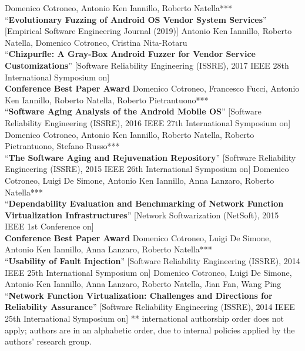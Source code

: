 \documentclass[margin,line]{resume}
\begin{document}
\begin{resume}
\filbreak
Domenico Cotroneo, Antonio Ken Iannillo, Roberto Natella***\\
``\textbf{Evolutionary Fuzzing of Android OS Vendor System Services}''
[Empirical Software Engineering Journal (2019)]
\filbreak
Antonio Ken Iannillo, Roberto Natella, Domenico Cotroneo, Cristina Nita-Rotaru\\
``\textbf{Chizpurfle: A Gray-Box Android Fuzzer for Vendor Service Customizations}''
[Software Reliability Engineering (ISSRE), 2017 IEEE 28th International Symposium on]\\\textbf{Conference Best Paper Award}
\filbreak
Domenico Cotroneo, Francesco Fucci, Antonio Ken Iannillo, Roberto Natella, Roberto Pietrantuono***\\
``\textbf{Software Aging Analysis of the Android Mobile OS}''
[Software Reliability Engineering (ISSRE), 2016 IEEE 27th International Symposium on]
\filbreak
Domenico Cotroneo, Antonio Ken Iannillo, Roberto Natella, Roberto Pietrantuono, Stefano Russo***\\
``\textbf{The Software Aging and Rejuvenation Repository}''
[Software Reliability Engineering (ISSRE), 2015 IEEE 26th International Symposium on]
\filbreak
Domenico Cotroneo, Luigi De Simone, Antonio Ken Iannillo, Anna Lanzaro, Roberto Natella***\\
``\textbf{Dependability Evaluation and Benchmarking of Network Function Virtualization Infrastructures}''
[Network Softwarization (NetSoft), 2015 IEEE 1st Conference on]\\\textbf{Conference Best Paper Award}
\filbreak
Domenico Cotroneo, Luigi De Simone, Antonio Ken Iannillo, Anna Lanzaro, Roberto Natella***\\
``\textbf{Usability of Fault Injection}''
[Software Reliability Engineering (ISSRE), 2014 IEEE 25th International Symposium on]
\filbreak
Domenico Cotroneo, Luigi De Simone, Antonio Ken Iannillo, Anna Lanzaro, Roberto Natella, Jian Fan, Wang Ping\\
``\textbf{Network Function Virtualization: Challenges and Directions for Reliability Assurance}''
[Software Reliability Engineering (ISSRE), 2014 IEEE 25th International Symposium on]
\filbreak
{\footnotesize*** international authorship order does not apply; authors are in an alphabetic order, due to internal policies applied by the authors' research group.}








\end{resume}
\end{document}

